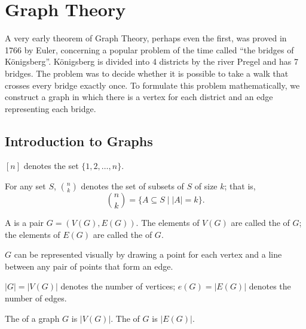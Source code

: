 \chapter{Graph Theory}

A very early theorem of Graph Theory, perhaps even the first, was proved in 1766 by Euler, concerning a popular problem of the time called ``the bridges of K\"{o}nigsberg''. K\"{o}nigsberg is divided into 4 districts by the river Pregel and has 7 bridges. The problem was to decide whether it is possible to take a walk that crosses every bridge exactly once. To formulate this problem mathematically, we construct a graph in which there is a vertex for each district and an edge representing each bridge.

\section{Introduction to Graphs}
\begin{notation}
$[n]$ denotes the set $\{1,2,\dots,n\}$.
\end{notation}

\begin{notation}
For any set $S$, $\binom{n}{k}$ denotes the set of subsets of $S$ of size $k$; that is,
\[\binom{n}{k}=\{A\subseteq S\mid|A|=k\}.\]
\end{notation}

\begin{definition}[Graph]
A  is a pair $G=(V(G),E(G))$. The elements of $V(G)$ are called the  of $G$; the elements of $E(G)$ are called the  of $G$.
\end{definition}

$G$ can be represented visually by drawing a point for each vertex and a line between any pair of points that form an edge.

\begin{notation}
$|G|=|V(G)|$ denotes the number of vertices; $e(G)=|E(G)|$ denotes the number of edges.
\end{notation}

\begin{definition}
The  of a graph $G$ is $|V(G)|$. The  of $G$ is $|E(G)|$.
\end{definition}

